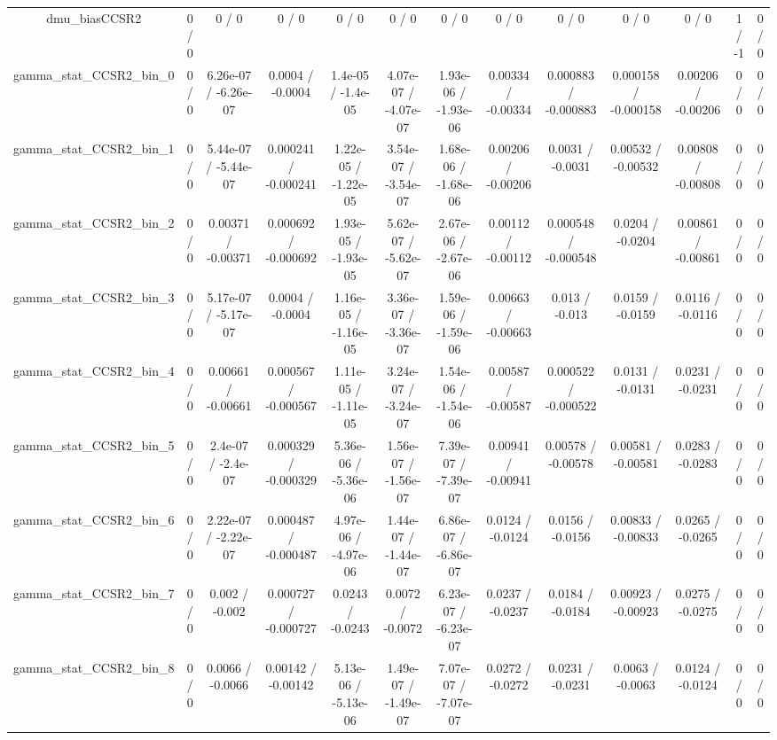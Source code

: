 \documentclass[10pt]{article}
\begin{document}
\begin{table}[htbp]
\begin{center}
\begin{tabular}{|c|c|c|c|c|c|c|c|c|c|c|c|c|}
  dmu_biasCCSR2 & 0 / 0 & 0 / 0 & 0 / 0 & 0 / 0 & 0 / 0 & 0 / 0 & 0 / 0 & 0 / 0 & 0 / 0 & 0 / 0 & 1 / -1 & 0 / 0 \\ 
  gamma_stat_CCSR2_bin_0 & 0 / 0 & 6.26e-07 / -6.26e-07 & 0.0004 / -0.0004 & 1.4e-05 / -1.4e-05 & 4.07e-07 / -4.07e-07 & 1.93e-06 / -1.93e-06 & 0.00334 / -0.00334 & 0.000883 / -0.000883 & 0.000158 / -0.000158 & 0.00206 / -0.00206 & 0 / 0 & 0 / 0 \\ 
  gamma_stat_CCSR2_bin_1 & 0 / 0 & 5.44e-07 / -5.44e-07 & 0.000241 / -0.000241 & 1.22e-05 / -1.22e-05 & 3.54e-07 / -3.54e-07 & 1.68e-06 / -1.68e-06 & 0.00206 / -0.00206 & 0.0031 / -0.0031 & 0.00532 / -0.00532 & 0.00808 / -0.00808 & 0 / 0 & 0 / 0 \\ 
  gamma_stat_CCSR2_bin_2 & 0 / 0 & 0.00371 / -0.00371 & 0.000692 / -0.000692 & 1.93e-05 / -1.93e-05 & 5.62e-07 / -5.62e-07 & 2.67e-06 / -2.67e-06 & 0.00112 / -0.00112 & 0.000548 / -0.000548 & 0.0204 / -0.0204 & 0.00861 / -0.00861 & 0 / 0 & 0 / 0 \\ 
  gamma_stat_CCSR2_bin_3 & 0 / 0 & 5.17e-07 / -5.17e-07 & 0.0004 / -0.0004 & 1.16e-05 / -1.16e-05 & 3.36e-07 / -3.36e-07 & 1.59e-06 / -1.59e-06 & 0.00663 / -0.00663 & 0.013 / -0.013 & 0.0159 / -0.0159 & 0.0116 / -0.0116 & 0 / 0 & 0 / 0 \\ 
  gamma_stat_CCSR2_bin_4 & 0 / 0 & 0.00661 / -0.00661 & 0.000567 / -0.000567 & 1.11e-05 / -1.11e-05 & 3.24e-07 / -3.24e-07 & 1.54e-06 / -1.54e-06 & 0.00587 / -0.00587 & 0.000522 / -0.000522 & 0.0131 / -0.0131 & 0.0231 / -0.0231 & 0 / 0 & 0 / 0 \\ 
  gamma_stat_CCSR2_bin_5 & 0 / 0 & 2.4e-07 / -2.4e-07 & 0.000329 / -0.000329 & 5.36e-06 / -5.36e-06 & 1.56e-07 / -1.56e-07 & 7.39e-07 / -7.39e-07 & 0.00941 / -0.00941 & 0.00578 / -0.00578 & 0.00581 / -0.00581 & 0.0283 / -0.0283 & 0 / 0 & 0 / 0 \\ 
  gamma_stat_CCSR2_bin_6 & 0 / 0 & 2.22e-07 / -2.22e-07 & 0.000487 / -0.000487 & 4.97e-06 / -4.97e-06 & 1.44e-07 / -1.44e-07 & 6.86e-07 / -6.86e-07 & 0.0124 / -0.0124 & 0.0156 / -0.0156 & 0.00833 / -0.00833 & 0.0265 / -0.0265 & 0 / 0 & 0 / 0 \\ 
  gamma_stat_CCSR2_bin_7 & 0 / 0 & 0.002 / -0.002 & 0.000727 / -0.000727 & 0.0243 / -0.0243 & 0.0072 / -0.0072 & 6.23e-07 / -6.23e-07 & 0.0237 / -0.0237 & 0.0184 / -0.0184 & 0.00923 / -0.00923 & 0.0275 / -0.0275 & 0 / 0 & 0 / 0 \\ 
  gamma_stat_CCSR2_bin_8 & 0 / 0 & 0.0066 / -0.0066 & 0.00142 / -0.00142 & 5.13e-06 / -5.13e-06 & 1.49e-07 / -1.49e-07 & 7.07e-07 / -7.07e-07 & 0.0272 / -0.0272 & 0.0231 / -0.0231 & 0.0063 / -0.0063 & 0.0124 / -0.0124 & 0 / 0 & 0 / 0 \\ 

\end{tabular}
\end{center}
\end{table}
\end{document}
